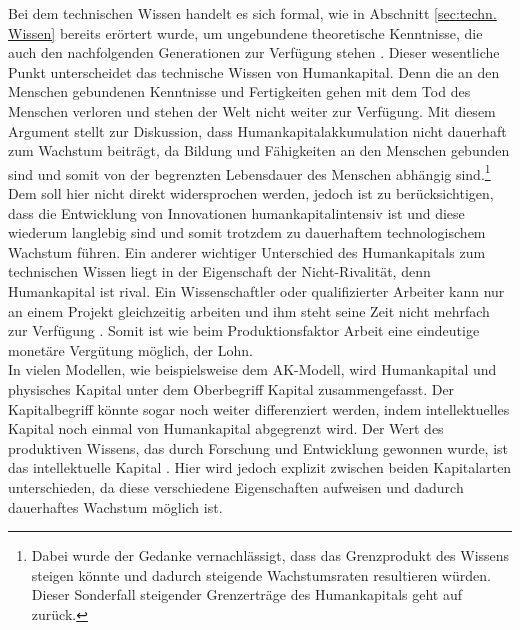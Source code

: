 Bei dem technischen Wissen handelt es sich formal, wie in Abschnitt \ref{sec:techn. Wissen} bereits erörtert wurde, um ungebundene theoretische Kenntnisse, die auch den nachfolgenden Generationen zur Verf{\"u}gung stehen \citep[Kapitel 10]{Frenkel.1999}. Dieser wesentliche Punkt unterscheidet das technische Wissen von Humankapital. Denn die an den Menschen gebundenen Kenntnisse und Fertigkeiten gehen mit dem Tod des Menschen verloren und stehen der Welt nicht weiter zur Verf{\"u}gung. Mit diesem Argument stellt \citet{Ha.2002} zur Diskussion, dass Humankapitalakkumulation nicht dauerhaft zum Wachstum beitr{\"a}gt, da Bildung und F{\"a}higkeiten an den Menschen gebunden sind und somit von der begrenzten Lebensdauer des Menschen abh{\"a}ngig sind.\footnote{Dabei wurde der Gedanke vernachl{\"a}ssigt, dass das Grenzprodukt des Wissens steigen k{\"o}nnte und dadurch steigende Wachstumsraten resultieren würden. Dieser Sonderfall steigender Grenzertr{\"a}ge des Humankapitals geht auf \citet{Romer.1986} zurück.}  Dem soll hier nicht direkt widersprochen werden, jedoch ist zu ber{\"u}cksichtigen, dass die Entwicklung von Innovationen humankapitalintensiv ist und diese wiederum langlebig sind und somit trotzdem zu dauerhaftem technologischem Wachstum führen. 
Ein anderer wichtiger Unterschied des Humankapitals zum technischen Wissen liegt in der Eigenschaft der Nicht-Rivalität, denn Humankapital ist rival. Ein Wissenschaftler oder qualifizierter Arbeiter kann nur an einem Projekt gleichzeitig arbeiten und ihm steht seine Zeit nicht mehrfach zur Verfügung \citep{Romer.1993}. Somit ist wie beim Produktionsfaktor Arbeit eine eindeutige monet{\"a}re Verg{\"u}tung m{\"o}glich, der Lohn.\\


In vielen Modellen, wie beispielsweise dem AK-Modell, wird Humankapital und physisches Kapital unter dem Oberbegriff Kapital zusammengefasst. Der Kapitalbegriff könnte sogar noch weiter differenziert werden, indem intellektuelles Kapital noch einmal von Humankapital abgegrenzt wird. Der Wert des produktiven Wissens, das durch Forschung und Entwicklung gewonnen wurde, ist das intellektuelle Kapital \citep{Dosi.1993}. Hier wird jedoch explizit zwischen beiden Kapitalarten unterschieden, da diese verschiedene Eigenschaften aufweisen und dadurch dauerhaftes Wachstum möglich ist. 

